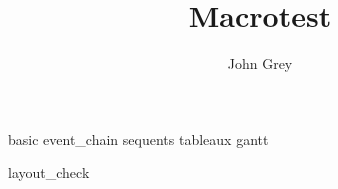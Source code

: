 \documentclass[12pt,draft]{book}
\title{Macrotest}
\author{John Grey}
\begin{document}
\frontmatter
\maketitle
\tableofcontents
{}

\mainmatter
\setlength{\parskip}{1.5em}

{basic}
{event_chain}
{sequents}
{tableaux}
{gantt}

\appendix

{layout_check}

\backmatter
% 
% 
\end{document}
